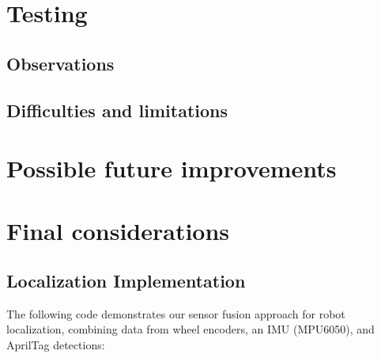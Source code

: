 \documentclass{article}
\begin{document}
\begin{minipage}[t]{0.5\textwidth}
\end{minipage}


\newpage
\section{Testing}
\subsection{Observations}
\subsection{Difficulties and limitations}

\newpage
\section{Possible future improvements}

\newpage
\section{Final considerations}

\subsection{Localization Implementation}
The following code demonstrates our sensor fusion approach for robot localization, combining data from wheel encoders, an IMU (MPU6050), and AprilTag detections:
\end{document}
